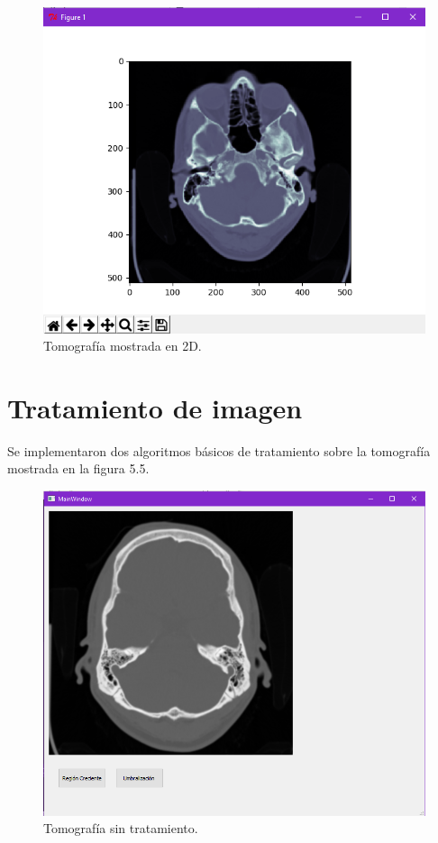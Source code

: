 \documentclass[12pt]{report}
\begin{document}
\begin{figure}[H]
\centering
\includegraphics[width = 10 cm, height = 10 cm]{visua}
\caption{Tomografía mostrada en 2D.}
\end{figure}

\section{Tratamiento de imagen}
Se implementaron dos algoritmos básicos de tratamiento sobre la tomografía mostrada en la figura 5.5. 


\begin{figure}[H]
\centering
\includegraphics[width = 12 cm, height = 11 cm]{origin}
\caption{Tomografía sin tratamiento.}
\end{figure}
\end{document}
